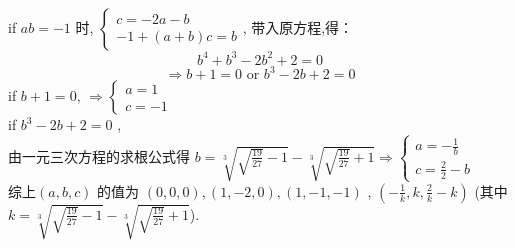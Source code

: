 \documentclass[a4paper,11pt,UTF8]{article}
\begin{document}
if $a b=-1$ 时, $\left\{\begin{array}{l}c=-2 a-b \\ -1+(a+b) c=b\end{array}\right.$, 带入原方程,得：
$$
	b^4+b^3-2 b^2+2=0 
$$
$$\Rightarrow 	b+1=0 \text { or } b^3-2 b+2=0$$
if  $b+1=0$, $\Rightarrow\left\{\begin{array}{l}
	a=1 \\
	c=-1
\end{array}\right.$ \\
if $b^3-2 b+2=0$ ,\\ 由一元三次方程的求根公式得 $\displaystyle b=\sqrt[3]{\sqrt{\frac{19}{27}}-1}-\sqrt[3]{\sqrt{\frac{19}{27}}+1}\Rightarrow\left\{\begin{array}{l}
	\displaystyle a=-\frac{1}{b} \\
	\displaystyle c=\frac{2}{2}-b
\end{array}\right.$ \\
综上$(a, b, c)$ 的值为 $(0,0,0),(1,-2,0),(1,-1,-1)$ , $\displaystyle\left(-\frac{1}{k}, k, \frac{2}{k}-k\right)$ (其中 $\displaystyle k=\sqrt[3]{\sqrt{\frac{19}{27}}-1}-\sqrt[3]{\sqrt{\frac{19}{27}}+1}$).\\
\end{document}
